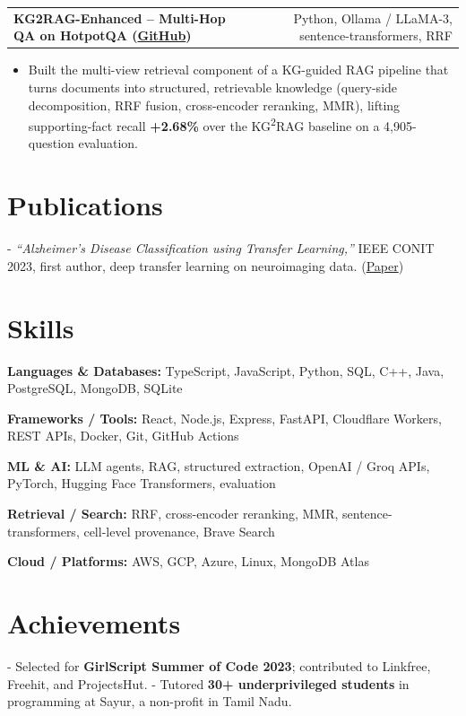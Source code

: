 \documentclass[letterpaper,11pt]{article}
\makeatletter
\newcommand{\projItem}[2]{%
  \vspace{4pt}
  \begin{tabular*}{\textwidth}{@{}l@{\extracolsep{\fill}}r@{}}
    \textbf{#1} & #2 \\
  \end{tabular*}\par\vspace{-2pt}
}
\newcommand{\skillLine}[2]{\textbf{#1:} #2\par\vspace{2pt}}
\newcommand{\inlineBlock}[1]{{\setlength{\leftskip}{0.18in}\small #1\par}}
\makeatother
\begin{document}
\projItem{KG2RAG-Enhanced -- Multi-Hop QA on HotpotQA {\normalfont\small(\href{https://github.com/Deva-1903/KG2RAG-685-NLP}{GitHub})}}{Python, Ollama / LLaMA-3, sentence-transformers, RRF}
\begin{itemize}
  \item Built the multi-view retrieval component of a KG-guided RAG pipeline that turns documents into structured, retrievable knowledge (query-side decomposition, RRF fusion, cross-encoder reranking, MMR), lifting supporting-fact recall \textbf{+2.68\%} over the KG\textsuperscript{2}RAG baseline on a 4{,}905-question evaluation.
\end{itemize}

\section{Publications}
\inlineBlock{- \textit{``Alzheimer's Disease Classification using Transfer Learning,''} IEEE CONIT 2023, first author, deep transfer learning on neuroimaging data. {\normalfont\small(\href{https://ieeexplore.ieee.org/document/10205760}{Paper})}}

\section{Skills}
\skillLine{Languages \& Databases}{TypeScript, JavaScript, Python, SQL, C++, Java, PostgreSQL, MongoDB, SQLite}
\skillLine{Frameworks / Tools}{React, Node.js, Express, FastAPI, Cloudflare Workers, REST APIs, Docker, Git, GitHub Actions}
\skillLine{ML \& AI}{LLM agents, RAG, structured extraction, OpenAI / Groq APIs, PyTorch, Hugging Face Transformers, evaluation}
\skillLine{Retrieval / Search}{RRF, cross-encoder reranking, MMR, sentence-transformers, cell-level provenance, Brave Search}
\skillLine{Cloud / Platforms}{AWS, GCP, Azure, Linux, MongoDB Atlas}

\section{Achievements}
\inlineBlock{- Selected for \textbf{GirlScript Summer of Code 2023}; contributed to Linkfree, Freehit, and ProjectsHut. - Tutored \textbf{30+ underprivileged students} in programming at Sayur, a non-profit in Tamil Nadu.}
\end{document}
